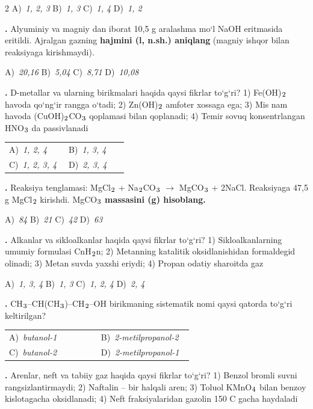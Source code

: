 \documentclass[11pt,a4paper]{article}
\renewcommand{\textsubscript}[1]{\ensuremath{_{\text{\fontsize{8}{8}\selectfont #1}}}}
\newcommand{\qn}[1]{\textbf{\fontsize{11.5}{13}\selectfont #1}}
\newcommand{\qsep}{\par\vspace{1pt}\noindent\rule{0pt}{0.4pt}\par\vspace{5pt}}
\begin{document}
\begin{multicols}{2}
\noindent A)~\textsl{1, 2, 3} \hfill B)~\textsl{1, 3} \hfill C)~\textsl{1, 4} \hfill D)~\textsl{1, 2}\par
\qsep
\noindent\qn{17.} Alyuminiy va magniy dan iborat 10,5 g aralashma mo`l NaOH eritmasida eritildi. Ajralgan gazning \textbf{hajmini (l, n.sh.) aniqlang} (magniy ishqor bilan reaksiyaga kirishmaydi).

\noindent A)~\textsl{20,16} \hfill B)~\textsl{5,04} \hfill C)~\textsl{8,71} \hfill D)~\textsl{10,08}\par
\qsep
\noindent\qn{18.} D-metallar va ularning birikmalari haqida qaysi fikrlar to`g`ri? 1) Fe(OH)\textsubscript{2} havoda qo`ng`ir rangga o`tadi; 2) Zn(OH)\textsubscript{2} amfoter xossaga ega; 3) Mis nam havoda (CuOH)\textsubscript{2}CO\textsubscript{3} qoplamasi bilan qoplanadi; 4) Temir sovuq konsentrlangan HNO\textsubscript{3} da passivlanadi

\noindent\begin{tabular}{@{}p{0.47\linewidth}@{}p{0.47\linewidth}@{}}
A)~\textsl{1, 2, 4} & B)~\textsl{1, 3, 4} \\
C)~\textsl{1, 2, 3, 4} & D)~\textsl{2, 3, 4} \\
\end{tabular}\par
\qsep
\noindent\qn{19.} Reaksiya tenglamasi: MgCl\textsubscript{2} + Na\textsubscript{2}CO\textsubscript{3} $\to$ MgCO\textsubscript{3} + 2NaCl. Reaksiyaga 47,5 g MgCl\textsubscript{2} kirishdi. MgCO\textsubscript{3} \textbf{massasini (g) hisoblang.}

\noindent A)~\textsl{84} \hfill B)~\textsl{21} \hfill C)~\textsl{42} \hfill D)~\textsl{63}\par
\qsep
\noindent\qn{20.} Alkanlar va sikloalkanlar haqida qaysi fikrlar to`g`ri? 1) Sikloalkanlarning umumiy formulasi CnH\textsubscript{2}n; 2) Metanning katalitik oksidlanishidan formaldegid olinadi; 3) Metan suvda yaxshi eriydi; 4) Propan odatiy sharoitda gaz

\noindent A)~\textsl{1, 3, 4} \hfill B)~\textsl{1, 3} \hfill C)~\textsl{1, 2, 4} \hfill D)~\textsl{2, 4}\par
\qsep
\noindent\qn{21.} CH\textsubscript{3}--CH(CH\textsubscript{3})--CH\textsubscript{2}--OH birikmaning sistematik nomi qaysi qatorda to`g`ri keltirilgan?

\noindent\begin{tabular}{@{}p{0.47\linewidth}@{}p{0.47\linewidth}@{}}
A)~\textsl{butanol-1} & B)~\textsl{2-metilpropanol-2} \\
C)~\textsl{butanol-2} & D)~\textsl{2-metilpropanol-1} \\
\end{tabular}\par
\qsep
\noindent\qn{22.} Arenlar, neft va tabiiy gaz haqida qaysi fikrlar to`g`ri? 1) Benzol bromli suvni rangsizlantirmaydi; 2) Naftalin -- bir halqali aren; 3) Toluol KMnO\textsubscript{4} bilan benzoy kislotagacha oksidlanadi; 4) Neft fraksiyalaridan gazolin 150 \textdegree{}C gacha haydaladi


\end{multicols}
\end{document}
